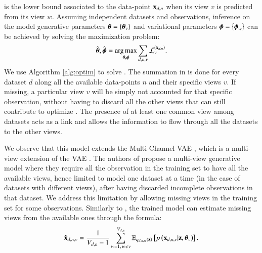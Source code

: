is the lower bound associated to the data-point $\mathbf{x}_{d,n}$ when its view $v$ is predicted from its view $w$.
Assuming independent datasets and observations, inference on the model generative parameters $\boldsymbol{\theta} = \left\{\boldsymbol{\theta}_v\right\}$ and variational parameters $\boldsymbol{\phi} = \left\{\boldsymbol{\phi}_w\right\}$ can be achieved by solving the maximization problem:
\begin{equation}\label{eq:argmax}
\begin{aligned}
\hat{\boldsymbol{\theta}}, \hat{\boldsymbol{\phi}} = \underset{\boldsymbol{\theta}, \boldsymbol{\phi}}{\operatorname{arg\,max}} \sum_{d,n,v} \mathcal{L}_v^{(\mathbf{x}_{d,n})}.
\end{aligned}
\end{equation}
We use Algorithm \ref{alg:optim} to solve .
The summation in  is done for every dataset $d$ along all the available data-points $n$ and their specific views $v$.
If missing, a particular view $v$ will be simply not accounted for that specific observation, without having to discard all the other views that can still contribute to optimize .
The presence of at least one common view among datasets acts as a link and allows the information to flow through all the datasets to the other views.

We observe that this model extends the Multi-Channel VAE \cite{Antelmi2019}, which is a multi-view extension of the VAE \cite{Kingma2013,Rezende2014}.
The authors of \cite{Antelmi2019} propose a multi-view generative model where they require all the observation in the training set to have all the available views, hence limited to model one dataset at a time (in the case of datasets with different views), after having discarded incomplete observations in that dataset.
We address this limitation by allowing missing views in the training set for some observations.
Similarly to \cite{Antelmi2019}, the trained model can estimate missing views from the available ones through the formula:
\begin{equation}\label{eq:reconstruction}
\begin{aligned}
\hat{\mathbf{x}}_{d,n,v} = \frac{1}{V_{d, n}-1} \sum_{w=1, \,w\neq v}^{V_{d, n}} \operatorname{\mathbb{E}}_{q_{d,n,w}(\mathbf{z})}\left[p\left(\mathbf{x}_{d,n,v}|\mathbf{z}, \boldsymbol{\theta}_v\right)\right].
\end{aligned}
\end{equation}

